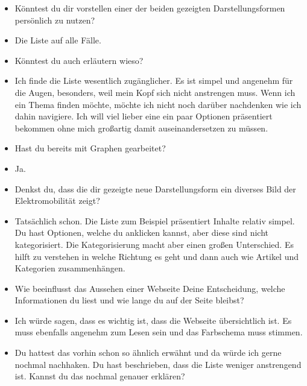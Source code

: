 {\begin{itemize}[]
                  Ein bisschen für das Thema habe ich mich auch persönlich interessiert und mir ein paar Artikel angeschaut.
                  Also Kontakt mit dem Thema hatte ich schon.
            \item {} Könntest du dir vorstellen einer der beiden gezeigten Darstellungsformen persönlich zu nutzen?
            \item {} Die Liste auf alle Fälle.
            \item {} Könntest du auch erläutern wieso?
            \item {} Ich finde die Liste wesentlich zugänglicher.
                  Es ist simpel und angenehm für die Augen, besonders, weil mein Kopf sich nicht anstrengen muss.
                  Wenn ich ein Thema finden möchte, möchte ich nicht noch darüber nachdenken wie ich dahin navigiere.
                  Ich will viel lieber eine ein paar Optionen präsentiert bekommen ohne mich großartig damit auseinandersetzen zu müssen.
            \item {} Hast du bereits mit Graphen gearbeitet?
            \item {} Ja.
            \item {} Denkst du, dass die dir gezeigte neue Darstellungsform ein diverses Bild der Elektromobilität zeigt?
            \item {} Tatsächlich schon. Die Liste zum Beispiel präsentiert Inhalte relativ simpel.
                  Du hast Optionen, welche du anklicken kannst, aber diese sind nicht kategorisiert.
                  Die Kategorisierung macht aber einen großen Unterschied.
                  Es hilft zu verstehen in welche Richtung es geht und dann auch wie Artikel und Kategorien zusammenhängen.
            \item {} Wie beeinflusst das Aussehen einer Webseite Deine Entscheidung, welche Informationen du liest und wie lange du auf der Seite bleibst?
            \item {} Ich würde sagen, dass es wichtig ist, dass die Webseite übersichtlich ist.
                  Es muss ebenfalls angenehm zum Lesen sein und das Farbschema muss stimmen.
            \item {} Du hattest das vorhin schon so ähnlich erwähnt und da würde ich gerne nochmal nachhaken.
                  Du hast beschrieben, dass die Liste weniger anstrengend ist.
                  Kannst du das nochmal genauer erklären?

\end{itemize}}
